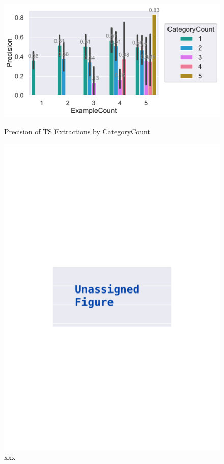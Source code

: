 \documentclass[\myrootdir/main.tex]{subfiles}
\begin{document}
\begin{figure}[htbp]
	\centering
	\begin{minipage}{0.45\textwidth}
		\centering
		\includegraphics[width=\textwidth, clip]{img/big-study/precision-categorycount-examplecount-ir.pdf}
		\caption{Precision of TS Extractions by CategoryCount}
		\label{fig:precision-categorycount-examplecount-ir}
	\end{minipage}\hfill
	\begin{minipage}{0.45\textwidth}
		\centering
		\includegraphics[width=\textwidth, clip]{img/big-study/xxx.pdf}
		\caption{xxx}
		\label{fig:xxx}
	\end{minipage}
\end{figure}
\end{document}
